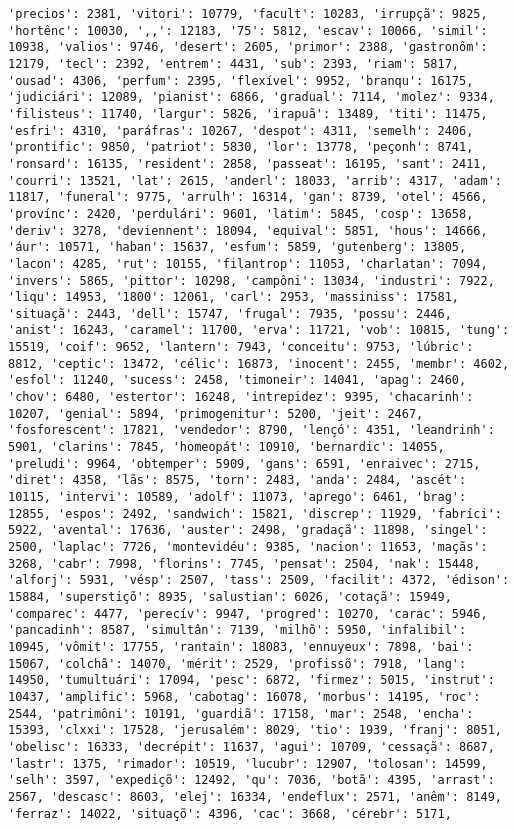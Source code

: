 \begin{Verbatim}[commandchars=\\\{\}]
'precios': 2381, 'vitori': 10779, 'facult': 10283, 'irrupçã': 9825, 'hortênc': 10030, ',,': 12183, '75': 5812, 'escav': 10066, 'simil': 10938, 'valios': 9746, 'desert': 2605, 'primor': 2388, 'gastronôm': 12179, 'tecl': 2392, 'entrem': 4431, 'sub': 2393, 'riam': 5817, 'ousad': 4306, 'perfum': 2395, 'flexível': 9952, 'branqu': 16175, 'judiciári': 12089, 'pianist': 6866, 'gradual': 7114, 'molez': 9334, 'filisteus': 11740, 'largur': 5826, 'irapuã': 13489, 'titi': 11475, 'esfri': 4310, 'paráfras': 10267, 'despot': 4311, 'semelh': 2406, 'prontific': 9850, 'patriot': 5830, 'lor': 13778, 'peçonh': 8741, 'ronsard': 16135, 'resident': 2858, 'passeat': 16195, 'sant': 2411, 'courri': 13521, 'lat': 2615, 'anderl': 18033, 'arrib': 4317, 'adam': 11817, 'funeral': 9775, 'arrulh': 16314, 'gan': 8739, 'otel': 4566, 'provínc': 2420, 'perdulári': 9601, 'latim': 5845, 'cosp': 13658, 'deriv': 3278, 'deviennent': 18094, 'equival': 5851, 'hous': 14666, 'áur': 10571, 'haban': 15637, 'esfum': 5859, 'gutenberg': 13805, 'lacon': 4285, 'rut': 10155, 'filantrop': 11053, 'charlatan': 7094, 'invers': 5865, 'pittor': 10298, 'campôni': 13034, 'industri': 7922, 'liqu': 14953, '1800': 12061, 'carl': 2953, 'massiniss': 17581, 'situaçã': 2443, 'dell': 15747, 'frugal': 7935, 'possu': 2446, 'anist': 16243, 'caramel': 11700, 'erva': 11721, 'vob': 10815, 'tung': 15519, 'coif': 9652, 'lantern': 7943, 'conceitu': 9753, 'lúbric': 8812, 'ceptic': 13472, 'célic': 16873, 'inocent': 2455, 'membr': 4602, 'esfol': 11240, 'sucess': 2458, 'timoneir': 14041, 'apag': 2460, 'chov': 6480, 'estertor': 16248, 'intrepidez': 9395, 'chacarinh': 10207, 'genial': 5894, 'primogenitur': 5200, 'jeit': 2467, 'fosforescent': 17821, 'vendedor': 8790, 'lençó': 4351, 'leandrinh': 5901, 'clarins': 7845, 'homeopát': 10910, 'bernardic': 14055, 'preludi': 9964, 'obtemper': 5909, 'gans': 6591, 'enraivec': 2715, 'diret': 4358, 'lãs': 8575, 'torn': 2483, 'anda': 2484, 'ascét': 10115, 'intervi': 10589, 'adolf': 11073, 'aprego': 6461, 'brag': 12855, 'espos': 2492, 'sandwich': 15821, 'discrep': 11929, 'fabríci': 5922, 'avental': 17636, 'auster': 2498, 'gradaçã': 11898, 'singel': 2500, 'laplac': 7726, 'montevidéu': 9385, 'nacion': 11653, 'maçãs': 3268, 'cabr': 7998, 'florins': 7745, 'pensat': 2504, 'nak': 15448, 'alforj': 5931, 'vésp': 2507, 'tass': 2509, 'facilit': 4372, 'édison': 15884, 'superstiçõ': 8935, 'salustian': 6026, 'cotaçã': 15949, 'comparec': 4477, 'perecív': 9947, 'progred': 10270, 'carac': 5946, 'pancadinh': 8587, 'simultân': 7139, 'milhõ': 5950, 'infalibil': 10945, 'vômit': 17755, 'rantain': 18083, 'ennuyeux': 7898, 'bai': 15067, 'colchã': 14070, 'mérit': 2529, 'profissõ': 7918, 'lang': 14950, 'tumultuári': 17094, 'pesc': 6872, 'firmez': 5015, 'instrut': 10437, 'amplific': 5968, 'cabotag': 16078, 'morbus': 14195, 'roc': 2544, 'patrimôni': 10191, 'guardiã': 17158, 'mar': 2548, 'encha': 15393, 'clxxi': 17528, 'jerusalém': 8029, 'tio': 1939, 'franj': 8051, 'obelisc': 16333, 'decrépit': 11637, 'agui': 10709, 'cessaçã': 8687, 'lastr': 1375, 'rimador': 10519, 'lucubr': 12907, 'tolosan': 14599, 'selh': 3597, 'expediçõ': 12492, 'qu': 7036, 'botã': 4395, 'arrast': 2567, 'descasc': 8603, 'elej': 16334, 'endeflux': 2571, 'anêm': 8149, 'ferraz': 14022, 'situaçõ': 4396, 'cac': 3668, 'cérebr': 5171, 
\end{Verbatim}
